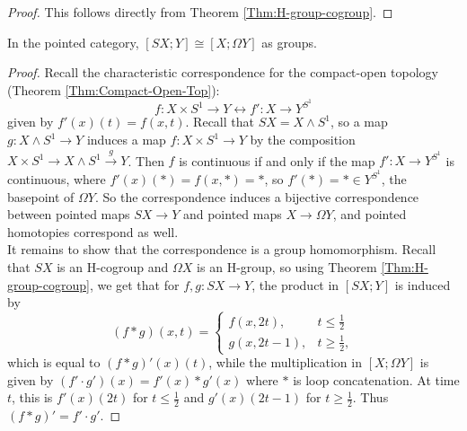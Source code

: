   \begin{proof}
      This follows directly from Theorem \ref{Thm:H-group-cogroup}.
  \end{proof}

  \begin{lemma}[]\label{Lemma:Suspension-Loop-Space}
      In the pointed category,
      $\left[ SX ; Y \right] \cong
      \left[ X ; \Omega Y \right]$ as groups.
  \end{lemma}
  
  \begin{proof}
      Recall the characteristic correspondence for
      the compact-open topology (Theorem \ref{Thm:Compact-Open-Top}):
      \[
      f\colon X \times S^{1} \to Y 
      \leftrightarrow f' \colon X \to Y^{S^{1}}
      \] 
      given by
      $f'(x) (t) = f(x,t)$.
      Recall that $SX = X \wedge S^{1}$, so
      a map
      $g \colon X \wedge S^{1} \to Y$ induces a map
      $f \colon X \times S^{1} \to Y$ by
      the composition 
      $X \times S^{1} \to X \wedge S^{1} \stackrel{g}{\to} Y$.
      Then $f$ is continuous if and only if
      the map $f' \colon X \to Y^{S^{1}}$ is continuous, where
      $f'(x)(*) = f(x,*) = *$, so
      $f'(*) = * \in Y^{S^{1}}$, the basepoint
      of $\Omega Y$.
      So the correspondence induces a bijective
      correspondence between pointed maps
      $SX \to Y$ and pointed maps $X \to \Omega Y$, and
      pointed homotopies correspond as well.\\
      It remains to show that the correspondence
      is a group homomorphism.
      Recall that $SX$ is an H-cogroup and
      $\Omega X$ is an H-group, so using
      Theorem \ref{Thm:H-group-cogroup}, we
      get that 
      for $f,g \colon SX \to Y$, the product in
      $\left[ SX;Y \right] $ is induced by
      \[
          \left( f*g \right) (x,t) = 
          \begin{cases}
              f(x,2t),& t\le \frac{1}{2}\\
              g\left( x,2t-1 \right),& t\ge \frac{1}{2},
          \end{cases}
      \] 
      which is equal to
      $\left( f*g \right)'(x)(t)$, 
      while the multiplication in
      $\left[ X ; \Omega Y \right] $ is given by
      $\left( f' \cdot g' \right) (x) = 
      f'(x) * g'(x)$ where $*$ is loop concatenation. 
      At time $t$, this is
      $f'(x) (2t)$ for $t\le \frac{1}{2}$ and
      $g'(x) (2t-1)$ for $t\ge \frac{1}{2}$. Thus
      $\left( f*g \right) ' = f' \cdot  g'$.
  \end{proof}


